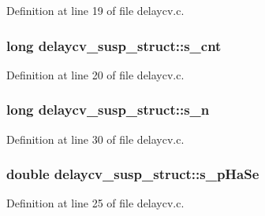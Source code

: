Definition at line 19 of file delaycv.\+c.

\subsubsection[{\texorpdfstring{s\+\_\+cnt}{s_cnt}}]{\setlength{\rightskip}{0pt plus 5cm}long delaycv\+\_\+susp\+\_\+struct\+::s\+\_\+cnt}\hypertarget{structdelaycv__susp__struct_a975929a7646b625e30863eb3912a1ba6}{}\label{structdelaycv__susp__struct_a975929a7646b625e30863eb3912a1ba6}


Definition at line 20 of file delaycv.\+c.

\subsubsection[{\texorpdfstring{s\+\_\+n}{s_n}}]{\setlength{\rightskip}{0pt plus 5cm}long delaycv\+\_\+susp\+\_\+struct\+::s\+\_\+n}\hypertarget{structdelaycv__susp__struct_a608a1827479162db71a686916de9d25a}{}\label{structdelaycv__susp__struct_a608a1827479162db71a686916de9d25a}


Definition at line 30 of file delaycv.\+c.

\subsubsection[{\texorpdfstring{s\+\_\+p\+Ha\+Se}{s_pHaSe}}]{\setlength{\rightskip}{0pt plus 5cm}double delaycv\+\_\+susp\+\_\+struct\+::s\+\_\+p\+Ha\+Se}\hypertarget{structdelaycv__susp__struct_a5e827bb28549f43fb0b9a14236f8b0fe}{}\label{structdelaycv__susp__struct_a5e827bb28549f43fb0b9a14236f8b0fe}


Definition at line 25 of file delaycv.\+c.

